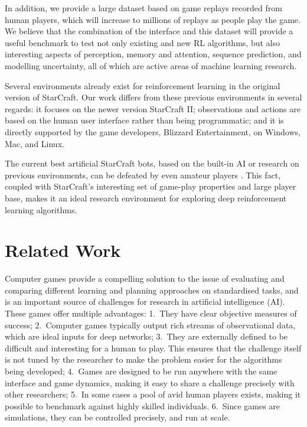 In addition, we provide a large dataset based on game replays recorded from human players, which will increase to millions of replays as people play the game. We believe that the combination of the interface and this dataset will provide a useful benchmark to test not only existing and new RL algorithms, but also interesting aspects of perception, memory and attention, sequence prediction, and modelling uncertainty, all of which are active areas of machine learning research.

Several environments \cite{BWAPI, Tian:2017elf, synnaeve2016torchcraft} already exist for reinforcement learning in the original version of StarCraft. Our work differs from these previous environments in several regards: it focuses on the newer version StarCraft II; observations and actions are based on the human user interface rather than being programmatic; and it is directly supported by the game developers, Blizzard Entertainment, on Windows, Mac, and Linux.

The current best artificial StarCraft bots, based on the built-in AI or research on previous environments, can be defeated by even amateur players \cite[cf.][and later versions of the AIIDE competition]{Buro:2012real}. This fact, coupled with StarCraft's interesting set of game-play properties and large player base, makes it an ideal research environment for exploring deep reinforcement learning algorithms.

\section{Related Work}

Computer games provide a compelling solution to the issue of evaluating and comparing different learning and planning approaches on standardised tasks, and is an important source of challenges for research in artificial intelligence (AI).  These games offer multiple advantages: 1.\ They have clear objective measures of success; 2.\ Computer games typically output rich streams of observational data, which are ideal inputs for deep networks; 3.\ They are externally defined to be difficult and interesting for a human to play.  This ensures that the challenge itself is not tuned by the researcher to make the problem easier for the algorithms being developed; 4.\ Games are designed to be run anywhere with the same interface and game dynamics, making it easy to share a challenge precisely with other researchers;  5.\ In some cases a pool of avid human players exists, making it possible to benchmark against highly skilled individuals. 6.\ Since games are simulations, they can be controlled precisely, and run at scale.

